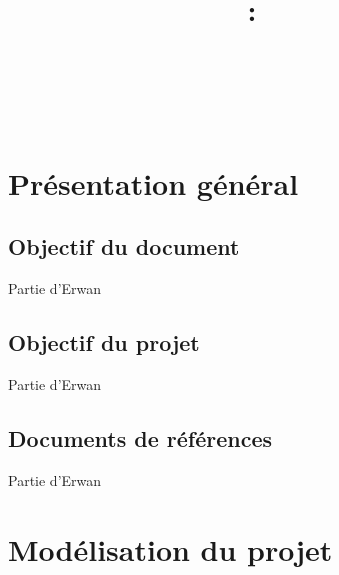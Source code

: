 \documentclass[11pt]{article}
\title{
\pagenumbering{roman} \setcounter{page}{0} %
\vspace{2in}
\textmd{\textbf{\hmwkClass:\ \hmwkTitle}}\\
\normalsize\vspace{0.1in}\small{\hmwkDueDate}\\
\vspace{0.1in}\large{\textit{\hmwkClassInstructor\ }}
\vspace{3in}
}
\author{\textbf{\hmwkAuthorName}}
\date{\hmwkAuthorClasse} %
\begin{document}
\thispagestyle{empty}
\maketitle
\newpage



\thispagestyle{empty}
 \setcounter{page}{0} %
\renewcommand\contentsname{Sommaire}
\tableofcontents
\newpage



\newpage

\section{Présentation général}

\subsection{Objectif du document}

Partie d'Erwan
\subsection{Objectif du projet}

Partie d'Erwan
\subsection{Documents de références}

Partie d'Erwan



\newpage


\section{Modélisation du projet}
\end{document}
